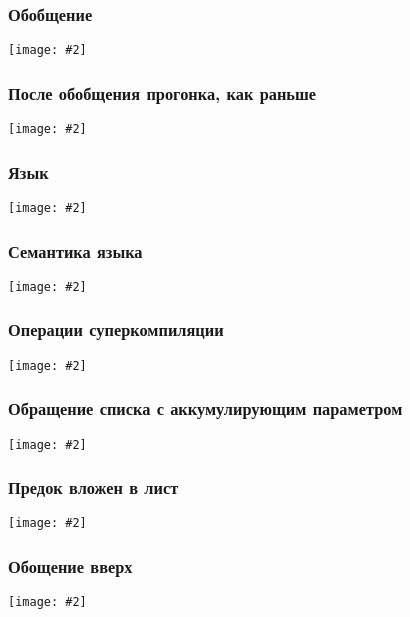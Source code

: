 \documentclass{beamer}
\newcommand{\incimage}[2][0.8]{ 
  \begin{center}   
    \texttt{[image: \#2]}
  \end{center}
  }
\begin{document}
\begin{frame}[fragile]
  \transwipe[direction=90]
  \frametitle{Обобщение}


    \incimage{applet0.png}

\end{frame}

\begin{frame}[fragile]
  \transwipe[direction=90]
  \frametitle{После обобщения прогонка, как раньше}


    \incimage{applet1.png}

\end{frame}

\begin{frame}[fragile]
  \transwipe[direction=90]
  \frametitle{Язык}


    \incimage{lang.png}

\end{frame}


\begin{frame}[fragile]
  \transwipe[direction=90]
  \frametitle{Семантика языка}


    \incimage{normrules.png}

\end{frame}


\begin{frame}[fragile]
  \transwipe[direction=90]
  \frametitle{Операции суперкомпиляции}


    \incimage{supercompilation.png}

\end{frame}

\begin{frame}[fragile]
  \transwipe[direction=90]
  \frametitle{Обращение списка с аккумулирующим параметром}


    \incimage{revdef.png}

\end{frame}


\begin{frame}[fragile]
  \transwipe[direction=90]
  \frametitle{Предок вложен в лист}


    \incimage{revtree0.png}

\end{frame}


\begin{frame}[fragile]
  \transwipe[direction=90]
  \frametitle{Обощение вверх}


    \incimage{revtreegen0.png}

\end{frame}
\end{document}
